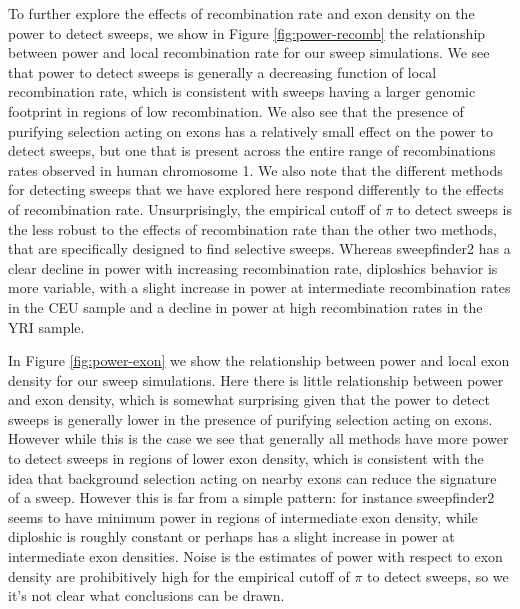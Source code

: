 \documentclass[hidelinks]{article}
\begin{document}
    To further explore the effects of recombination rate and exon density on the power to detect sweeps, we show in Figure \ref{fig:power-recomb}
    the relationship between power and local recombination rate for our sweep simulations. We see that power to detect sweeps is generally
    a decreasing function of local recombination rate, which is consistent with sweeps having a larger genomic footprint in regions of low
    recombination. We also see that the presence of purifying selection acting on exons has a relatively small effect on the power to detect sweeps,    
    but one that is present across the entire range of recombinations rates observed in human chromosome 1. 
    We also note that the different methods for detecting sweeps that we have explored here respond differently to the effects of recombination rate.
    Unsurprisingly, the empirical cutoff of $\pi$ to detect sweeps is the less robust to the effects of recombination rate than the other two methods,
    that are specifically designed to find selective sweeps. Whereas sweepfinder2 has a clear decline in power with increasing recombination rate,
    diploshics behavior is more variable, with a slight increase in power at intermediate recombination rates in the CEU sample and a decline
    in power at high recombination rates in the YRI sample.

    In Figure \ref{fig:power-exon} we show the relationship between power and local exon density for our sweep simulations.
    Here there is little relationship between power and exon density, which is somewhat surprising given that the power to detect sweeps
    is generally lower in the presence of purifying selection acting on exons. However while this is the case we see that 
    generally all methods have more power to detect sweeps in regions of lower exon density, which is consistent with the idea that
    background selection acting on nearby exons can reduce the signature of a sweep. However this is far from a simple pattern:
    for instance sweepfinder2 seems to have minimum power in regions of intermediate exon density, while diploshic is roughly constant
    or perhaps has a slight increase in power at intermediate exon densities. Noise is the estimates of power with respect to exon density
    are prohibitively high for the empirical cutoff of $\pi$ to detect sweeps, so we it's not clear what conclusions can be drawn.

\lipsum[20-25]
\end{document}
